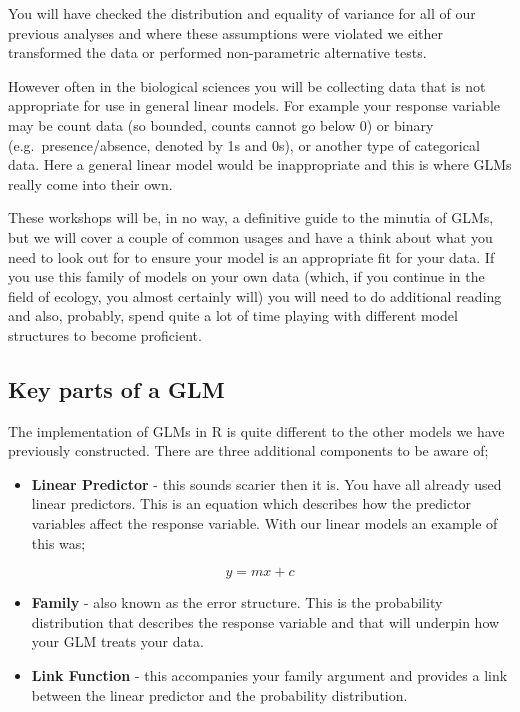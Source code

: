 \documentclass[
]{book}
\providecommand{\tightlist}{%
  \setlength{\itemsep}{0pt}\setlength{\parskip}{0pt}}
\begin{document}
You will have checked the distribution and equality of variance for all of our previous analyses and where these assumptions were violated we either transformed the data or performed non-parametric alternative tests.

However often in the biological sciences you will be collecting data that is not appropriate for use in general linear models. For example your response variable may be count data (so bounded, counts cannot go below 0) or binary (e.g.~presence/absence, denoted by 1s and 0s), or another type of categorical data. Here a general linear model would be inappropriate and this is where GLMs really come into their own.

These workshops will be, in no way, a definitive guide to the minutia of GLMs, but we will cover a couple of common usages and have a think about what you need to look out for to ensure your model is an appropriate fit for your data. If you use this family of models on your own data (which, if you continue in the field of ecology, you almost certainly will) you will need to do additional reading and also, probably, spend quite a lot of time playing with different model structures to become proficient.

\hypertarget{key-parts-of-a-glm}{%
\subsection{Key parts of a GLM}\label{key-parts-of-a-glm}}

The implementation of GLMs in R is quite different to the other models we have previously constructed. There are three additional components to be aware of;

\begin{itemize}
\tightlist
\item
  \textbf{Linear Predictor} - this sounds scarier then it is. You have all already used linear predictors. This is an equation which describes how the predictor variables affect the response variable. With our linear models an example of this was;
\end{itemize}

\[
y = mx + c
\]

\begin{itemize}
\tightlist
\item
  \textbf{Family} - also known as the error structure. This is the probability distribution that describes the response variable and that will underpin how your GLM treats your data.
\item
  \textbf{Link Function} - this accompanies your family argument and provides a link between the linear predictor and the probability distribution.
\end{itemize}
\end{document}

